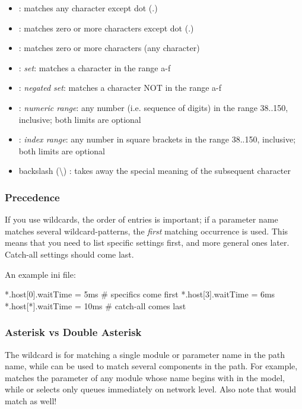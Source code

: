 \begin{itemize}
  \item {} : matches any character except dot (.)
  \item \ttt{*} : matches zero or more characters except dot (.)
  \item \ttt{**} : matches zero or more characters (any character)
  \item {} : \textit{set}: matches a character in the range a-f
  \item {}: \textit{negated set}: matches a character
    NOT in the range a-f
  \item {} : \textit{numeric range}: any number (i.e. sequence of digits)
    in the range 38..150, inclusive; both limits are optional
  \item \ttt{[38..150]} : \textit{index range}: any number in square brackets in the
    range 38..150, inclusive; both limits are optional
  \item backslash ({\textbackslash}) : takes away the special meaning of the
    subsequent character
\end{itemize}

\subsubsection{Precedence}
\label{sec:config-sim:precedence-of-entries}

If you use wildcards, the order of entries is important; if a parameter
name matches several wildcard-patterns, the \textit{first} matching occurrence
is used. This means that you need to list specific settings first, and
more general ones later. Catch-all settings should come last.

An example ini file:

\begin{inifile}
[General]
*.host[0].waitTime = 5ms   # specifics come first
*.host[3].waitTime = 6ms
*.host[*].waitTime = 10ms  # catch-all comes last
\end{inifile}


\subsubsection{Asterisk vs Double Asterisk}
\label{sec:config-sim:asterisk-vs-double-asterisk}

The \ttt{*} wildcard is for matching a single module or parameter name in the
path name, while \ttt{**} can be used to match several components in the path.
For example,  matches the  parameter of any module
whose name begins with  in the model, while 
or  selects only queues immediately on network level.
Also note that  would match 
as well!

